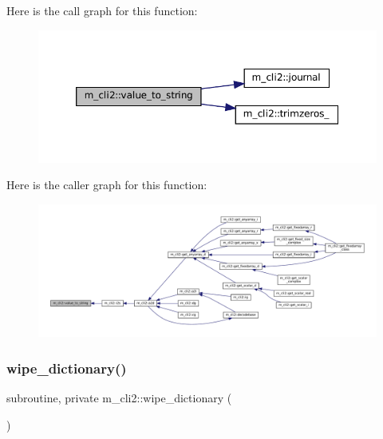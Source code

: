 Here is the call graph for this function\+:
\nopagebreak
\begin{figure}[H]
\begin{center}
\leavevmode
\includegraphics[width=350pt]{namespacem__cli2_a1bbcefd886dabb0286e2cb14ab54034f_cgraph}
\end{center}
\end{figure}
Here is the caller graph for this function\+:
\nopagebreak
\begin{figure}[H]
\begin{center}
\leavevmode
\includegraphics[width=350pt]{namespacem__cli2_a1bbcefd886dabb0286e2cb14ab54034f_icgraph}
\end{center}
\end{figure}
\mbox{\label{namespacem__cli2_ab1525b0419475486f520ef502daa5e94}} 
\subsubsection{\texorpdfstring{wipe\+\_\+dictionary()}{wipe\_dictionary()}}
{\footnotesize\ttfamily subroutine, private m\+\_\+cli2\+::wipe\+\_\+dictionary (\begin{DoxyParamCaption}{ }\end{DoxyParamCaption})\hspace{0.3cm}{\ttfamily [private]}}



